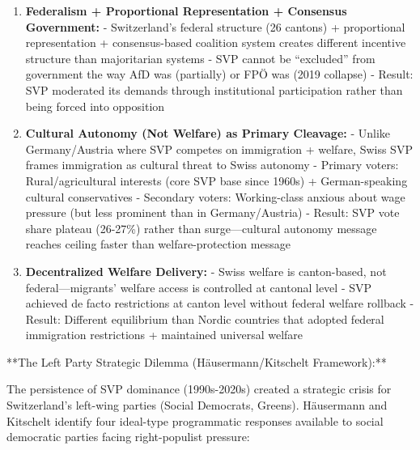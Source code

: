 \begin{enumerate}

\item \textbf{Federalism + Proportional Representation + Consensus Government:}
   - Switzerland's federal structure (26 cantons) + proportional representation + consensus-based coalition system creates different incentive structure than majoritarian systems
   - SVP cannot be ``excluded'' from government the way AfD was (partially) or FPÖ was (2019 collapse)
   - Result: SVP moderated its demands through institutional participation rather than being forced into opposition

\item \textbf{Cultural Autonomy (Not Welfare) as Primary Cleavage:}
   - Unlike Germany/Austria where SVP competes on immigration + welfare, Swiss SVP frames immigration as cultural threat to Swiss autonomy
   - Primary voters: Rural/agricultural interests (core SVP base since 1960s) + German-speaking cultural conservatives
   - Secondary voters: Working-class anxious about wage pressure (but less prominent than in Germany/Austria)
   - Result: SVP vote share plateau (26-27\%) rather than surge—cultural autonomy message reaches ceiling faster than welfare-protection message

\item \textbf{Decentralized Welfare Delivery:}
   - Swiss welfare is canton-based, not federal—migrants' welfare access is controlled at cantonal level
   - SVP achieved de facto restrictions at canton level without federal welfare rollback
   - Result: Different equilibrium than Nordic countries that adopted federal immigration restrictions + maintained universal welfare

\end{enumerate}

**The Left Party Strategic Dilemma (Häusermann/Kitschelt Framework):**

The persistence of SVP dominance (1990s-2020s) created a strategic crisis for Switzerland's left-wing parties (Social Democrats, Greens). Häusermann and Kitschelt identify four ideal-type programmatic responses available to social democratic parties facing right-populist pressure:

